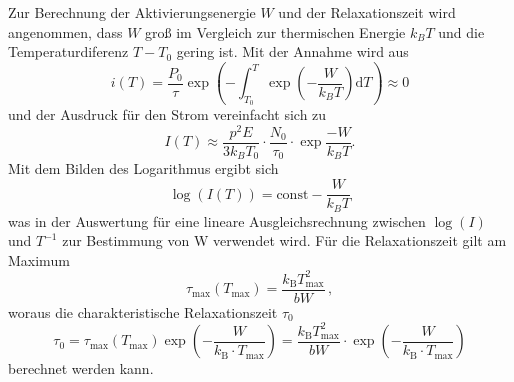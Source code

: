 Zur Berechnung der Aktivierungsenergie $W$ und der Relaxationszeit wird angenommen,
dass $W$ groß im Vergleich zur thermischen Energie $k_B T$
und die Temperaturdiferenz $T - T_0$ gering ist.
Mit der Annahme wird aus 
\begin{equation}
    i(T) = \frac{P_0}{\tau} \exp\!\left(-\int_{T_0}^T
      \exp\!\left(- \frac{W}{k_B T}\right) \text{d}{T}\right) \approx 0
\end{equation}
und der Ausdruck für den Strom vereinfacht sich zu 
\begin{equation}
    I(T) \approx \frac{p^2E}{3k_B T_0}\cdot\frac{N_0}{\tau_0}\cdot\exp{\frac{-W}{k_B T}}.
\end{equation}
Mit dem Bilden des Logarithmus ergibt sich
\begin{equation}
    \log(I(T)) = \text{const} -\frac{W}{k_B T}
    \label{eq:W1}
\end{equation}
was in der Auswertung für eine lineare Ausgleichsrechnung zwischen $\log(I)$
und $T^{-1}$ zur Bestimmung von W verwendet wird.
Für die Relaxationszeit gilt am Maximum 
\begin{equation}
    \tau_{\text{max}} (T_{\text{max}}) = \frac{k_\text{B} T^2_{\text{max}}}{b W}\, ,
\end{equation}
woraus die charakteristische Relaxationszeit $\tau_0$ 
\begin{equation}
    \tau_0 = \tau_{\text{max}} (T_{\text{max}}) \exp \left(- \frac{W}{k_{\text{B}} \cdot T_\text{max}}\right) = \frac{k_\text{B} T^2_{\text{max}}}{b W} \cdot\exp \left(- \frac{W}{k_{\text{B}} \cdot T_\text{max}}\right)
    \label{eq:relax}
\end{equation}
berechnet werden kann.


